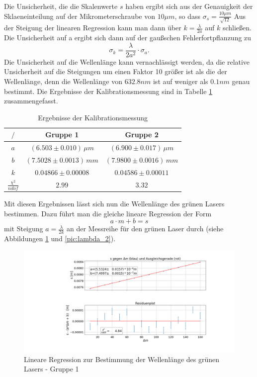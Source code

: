 \documentclass[a4paper, 11pt]{article}
\begin{document}
Die Unsicherheit, die die Skalenwerte $s$ haben ergibt sich aus der Genauigkeit der Sklaeneinteilung auf der Mikrometerschraube von $10 \mu m$, so dass $\sigma_s = \frac{10 \mu m }{\sqrt{12}}$
Aus der Steigung der linearen Regression kann man dann über $k = \frac{\lambda}{2a}$ auf $k$ schließen.
Die Unsicherheit auf a ergibt sich dann auf der gaußschen Fehlerfortpflanzung zu \[\sigma_k = \frac{\lambda}{2a^2} \cdot \sigma_a.\] Die Unsicherheit auf die Wellenlänge kann vernachlässigt werden, da die relative Unsicherheit auf die Steigungen um einen Faktor 10 größer ist als die der Wellenlänge, denn die Wellenlänge von $632.8 nm$ ist auf weniger als $0.1 nm$ genau bestimmt. Die Ergebnisse der Kalibrationsmessung sind in Tabelle \ref{table:Kalibration} zusammengefasst. 
\begin{table}[H]
	\renewcommand{\arraystretch}{1.5}
	\centering
	\begin{tabular}{|c|c|c|}
		\hline  $/$	&	Gruppe 1	&	Gruppe 2  	\\
		\hline	$a$ &	$ (6.503 \pm 0.010) \,\mu m$		&	$ (6.900 \pm 0.017)\, \mu m $ \\
		\hline  $b$	&	$ (7.5028 \pm 0.0013)\, mm$		&	$ (7.9800 \pm 0.0016)\, mm$ \\
		\hline  $k$	&	$ 0.04866 \pm 0.00008 $		&	$ 0.04586 \pm 0.00011$ \\
		\hline $\frac{\chi^2}{ndof}$	&	$2.99$	&	$3.32$	\\
		\hline
	\end{tabular}
	\caption{Ergebnisse der Kalibrationsmessung}
	\label{table:Kalibration}
\end{table}
Mit diesen Ergebnissen lässt sich nun die Wellenlänge des grünen Lasers bestimmen. Dazu führt man die gleiche lineare Regression der Form \[ a \cdot m + b = s\] mit Steigung $ a = \frac{\lambda}{2 k} $ an der Messreihe für den grünen Laser durch (siehe Abbildungen \ref{pic:lambda_1} und \ref{pic:lambda_2}).

\begin{figure}[H]
	\hskip-4cm
	\includegraphics[scale=0.45]{./Bilder/Wellenlaengenbestimmung_1.png}
	\caption{Lineare Regression zur Bestimmung der Wellenlänge des grünen Lasers - Gruppe 1}
	\label{pic:lambda_1}	
\end{figure}
\end{document}

